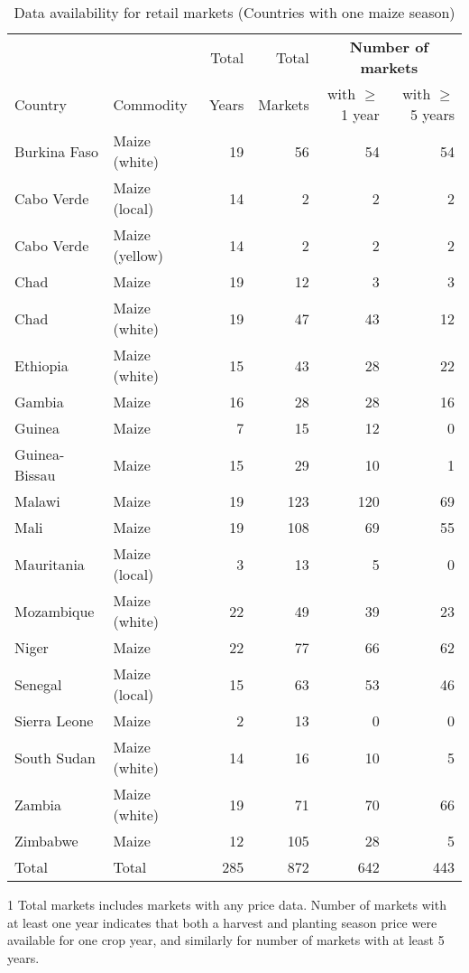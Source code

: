 \begin{table}[ht]
	\centering
	\begin{threeparttable}[t]
		\caption{Data availability for retail markets (Countries with one maize season)}
		\label{tab:avail_retail1}
		\begin{tabular}{|ll|rr|rr|}
			\hline
			&  & Total  & Total  & \multicolumn{2}{c}{\textbf{Number of markets}} \\ 
			Country & Commodity & Years & Markets & with $\geq$ 1 year & with $\geq$ 5 years \\ 
			\hline
Burkina Faso & Maize (white) &  19 &  56 &  54 &  54 \\ 
  Cabo Verde & Maize (local) &  14 &   2 &   2 &   2 \\ 
  Cabo Verde & Maize (yellow) &  14 &   2 &   2 &   2 \\ 
  Chad & Maize &  19 &  12 &   3 &   3 \\ 
  Chad & Maize (white) &  19 &  47 &  43 &  12 \\ 
  Ethiopia & Maize (white) &  15 &  43 &  28 &  22 \\ 
  Gambia & Maize &  16 &  28 &  28 &  16 \\ 
  Guinea & Maize &   7 &  15 &  12 &   0 \\ 
  Guinea-Bissau & Maize &  15 &  29 &  10 &   1 \\ 
  Malawi & Maize &  19 & 123 & 120 &  69 \\ 
  Mali & Maize &  19 & 108 &  69 &  55 \\ 
  Mauritania & Maize (local) &   3 &  13 &   5 &   0 \\ 
  Mozambique & Maize (white) &  22 &  49 &  39 &  23 \\ 
  Niger & Maize &  22 &  77 &  66 &  62 \\ 
  Senegal & Maize (local) &  15 &  63 &  53 &  46 \\ 
  Sierra Leone & Maize &   2 &  13 &   0 &   0 \\ 
  South Sudan & Maize (white) &  14 &  16 &  10 &   5 \\ 
  Zambia & Maize (white) &  19 &  71 &  70 &  66 \\ 
  Zimbabwe & Maize &  12 & 105 &  28 &   5 \\ 
  \hline
  Total & Total & 285 & 872 & 642 & 443 \\ 
  \hline
\end{tabular}
\begin{tablenotes}
\item [1] \footnotesize Total markets includes markets with any price data. Number of markets with at least one year indicates that both a harvest and planting season price were available for one crop year, and similarly for number of markets with at least 5 years. 
\end{tablenotes}
\end{threeparttable}
\end{table}

